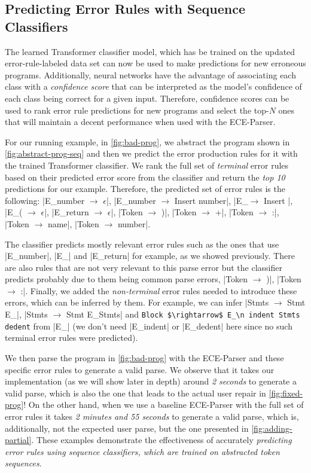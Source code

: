 \subsection{Predicting Error Rules with Sequence Classifiers}
\label{sec:overview:seq-classifiers}
The learned Transformer classifier model, which has be trained on the updated
error-rule-labeled data set can now be used to make predictions for new
erroneous programs. Additionally, neural networks have the advantage of
associating each class with a \emph{confidence score} that can be interpreted as
the model's confidence of each class being correct for a given input. Therefore,
confidence scores can be used to rank error rule predictions for new programs
and select the top-$N$ ones that will maintain a decent performance when used
with the ECE-Parser.

For our running example, in \autoref{fig:bad-prog}, we abstract the program
shown in \autoref{fig:abstract-prog-seq} and then we predict the error
production rules for it with the trained Transformer classifier. We rank the
full set of \emph{terminal} error rules based on their predicted error score
from the classifier and return the \emph{top 10} predictions for our example.
Therefore, the predicted set of error rules is the following:
%
|E_number $\rightarrow$ $\epsilon$|, |E_number $\rightarrow$ Insert number|,
%
|E_\n $\rightarrow$ Insert \n|, |E_( $\rightarrow$ $\epsilon$|, \linebreak
%
|E_return $\rightarrow$ $\epsilon$|, |Token $\rightarrow$ )|,
%
|Token $\rightarrow$ +|, |Token $\rightarrow$ :|, |Token $\rightarrow$ name|,
%
|Token $\rightarrow$ number|.

The classifier predicts mostly relevant error rules such as the ones that use
|E_number|, |E_\n| and |E_return| for example, as we showed previously. There
are also rules that are not very relevant to this parse error but the classifier
predicts probably due to them being common parse errors, \eg
%
|Token $\rightarrow$ )|, |Token $\rightarrow$ :|. Finally, we added the
\emph{non-terminal} error rules needed to introduce these errors, which can be
inferred by them. For example, we can infer
%
|Stmts $\rightarrow$ Stmt E_\n|, |Stmts $\rightarrow$ Stmt E_\n Stmts| and
%
\lstinline{Block $\rightarrow$ E_\n indent Stmts dedent} from |E_\n| (we don't
need |E_indent| or |E_dedent| here since no such terminal error rules were
predicted).

We then parse the program in \autoref{fig:bad-prog} with the ECE-Parser and
these specific error rules to generate a valid parse. We observe that it takes
our implementation (as we will show later in depth) around \emph{2 seconds} to
generate a valid parse, which is also the one that leads to the actual user
repair in \autoref{fig:fixed-prog}! On the other hand, when we use a baseline
ECE-Parser with the full set of error rules it takes \emph{2 minutes and 55
seconds} to generate a valid parse, which is, additionally, not the expected
user parse, but the one presented in \autoref{fig:adding-partial}. These
examples demonstrate the effectiveness of accurately \emph{predicting error
rules using sequence classifiers, which are trained on abstracted token
sequences}.

